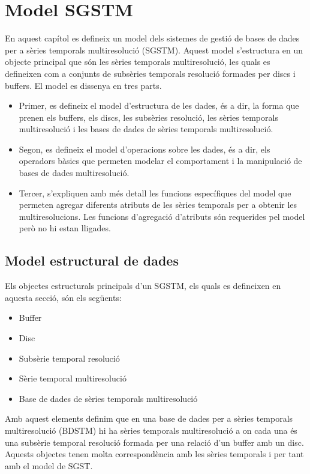 \chapter{Model SGSTM}
\label{cap:model:sgstm}


En aquest capítol es defineix un model dels sistemes de gestió de
bases de dades per a sèries temporals multiresolució (SGSTM). Aquest
model s'estructura en un objecte principal que són les sèries
temporals multiresolució, les quals es defineixen com a conjunts de
subsèries temporals resolució formades per discs i buffers. El model
es dissenya en tres parts.

\begin{itemize}
\item Primer, es defineix el model d'estructura de les dades, és a
  dir, la forma que prenen els buffers, els discs, les subsèries
  resolució, les sèries temporals multiresolució i les bases de dades
  de sèries temporals multiresolució.

\item Segon, es defineix el model d'operacions sobre les dades, és a
  dir, els operadors bàsics que permeten modelar el comportament i la
  manipulació de bases de dades multiresolució.

\item Tercer, s'expliquen amb més detall les funcions específiques del
  model que permeten agregar diferents atributs de les sèries
  temporals per a obtenir les multiresolucions. Les funcions
  d'agregació d'atributs són requerides pel model però no hi estan
  lligades.
\end{itemize}




\section{Model estructural de dades}

Els objectes estructurals principals d'un SGSTM, els quals es
defineixen en aquesta secció, són els següents:
\begin{itemize}
\item Buffer
\item Disc
\item Subsèrie temporal resolució
\item Sèrie temporal multiresolució
\item Base de dades de sèries temporals multiresolució
\end{itemize}

Amb aquest elements definim que en una base de dades per a sèries
temporals multiresolució (BDSTM) hi ha sèries temporals multiresolució
a on cada una és una subsèrie temporal resolució formada per una
relació d'un buffer amb un disc. Aquests objectes tenen molta
correspondència amb les sèries temporals i per tant amb el model de
SGST.


